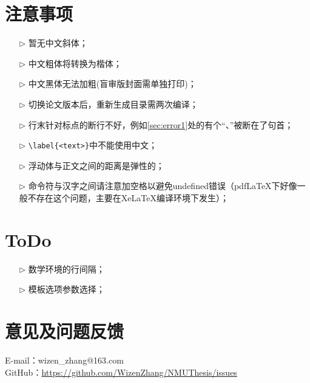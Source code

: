 \section{注意事项}
\begin{itemize}
  \item[$\triangleright$] 暂无中文斜体；
  \item[$\triangleright$] 中文粗体将转换为楷体；
  \item[$\triangleright$] 中文黑体无法加粗(盲审版封面需单独打印)；
  \item[$\triangleright$] 切换论文版本后，重新生成目录需两次编译；
  \item[$\triangleright$] 行末针对标点的断行不好，例如\ref{sec:error1}处的有个“、”被断在了句首；
  \item[$\triangleright$] \verb|\label{<text>}|中不能使用中文；
  \item[$\triangleright$] 浮动体与正文之间的距离是弹性的；
  \item[$\triangleright$] 命令符与汉字之间请注意加空格以避免undefined错误（pdfLaTeX下好像一般不存在这个问题，主要在XeLaTeX编译环境下发生）；
\end{itemize}

\section{ToDo}
\begin{itemize}
  \item[$\triangleright$] 数学环境的行间隔；
  \item[$\triangleright$] 模板选项参数选择；
\end{itemize}

\section{意见及问题反馈}

\indent E-mail：wizen\_zhang@163.com\\
\indent GitHub：\href{https://github.com/WizenZhang/NMUThesis/issues}{https://github.com/WizenZhang/NMUThesis/issues}


